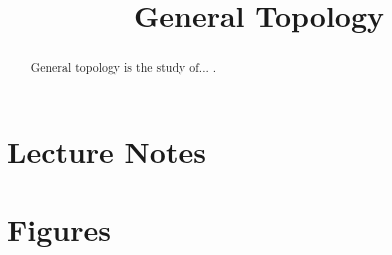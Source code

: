 \documentclass{article}
\title{General Topology}
\begin{document}
  \maketitle
  \begin{abstract}
	  General topology is the study of... \citep[pg 0-100]{Xample}.
  \end{abstract}
\tableofcontents






\newpage
\section{Lecture Notes}


\newpage
\section*{Figures}



  
\end{document}
